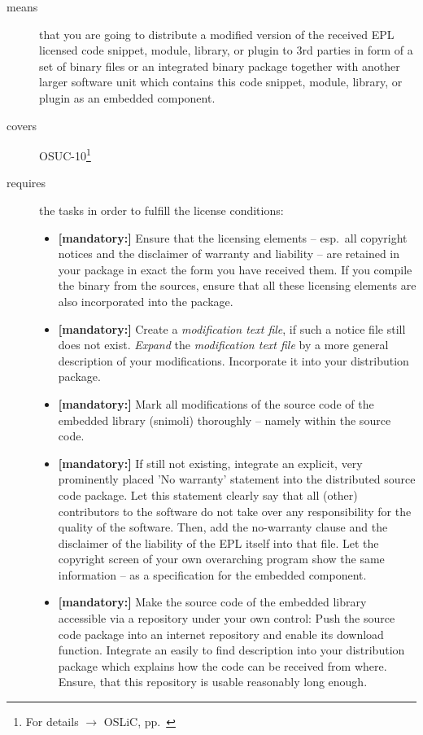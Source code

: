 \begin{description}
\item[means] that you are going to distribute a modified version of the received
EPL licensed code snippet, module, library, or plugin to 3rd parties in form
of a set of binary files or an integrated binary package together with another
larger software unit which contains this code snippet, module, library, or
plugin as an embedded component.
\item[covers] OSUC-10\footnote{For details $\rightarrow$ OSLiC, pp.\ \pageref{OSUC-10-DEF}}
\item[requires] the tasks in order to fulfill the license conditions:
\begin{itemize}

  \item \textbf{[mandatory:]} Ensure that the licensing elements -- esp.\ all
  copyright notices and the disclaimer of warranty and liability -- are retained
  in your package in exact the form you have received them. If you compile the
  binary from the sources, ensure that all these licensing elements are also
  incorporated into the package.
  
  \item \textbf{[mandatory:]} Create a \emph{modification text file}, if such a
  notice file still does not exist. \emph{Expand} the \emph{modification text
  file} by a more general description of your modifications. Incorporate it into
  your distribution package.

  \item \textbf{[mandatory:]} Mark all modifications of the source code of the
  embedded library (snimoli) thoroughly -- namely within the source code.

  \item \textbf{[mandatory:]} If still not existing, integrate an explicit, very
  prominently placed 'No warranty' statement into the distributed source code
  package. Let this statement clearly say that all (other) contributors to the
  software do not take over any responsibility for the quality of the software.
  Then, add the no-warranty clause and the disclaimer of the liability of the
  EPL itself into that file. Let the copyright screen of your own overarching
  program show the same information  -- as a specification for the embedded
  component.
  
  \item \textbf{[mandatory:]} Make the source code of the embedded library
  accessible via a repository under your own control: Push the source code
  package into an internet repository and enable its download function.
  Integrate an easily to find description into your distribution package which
  explains how the code can be received from where. Ensure, that this repository
  is usable reasonably long enough.
  

\end{itemize}
\end{description}
